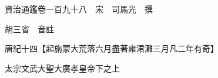 










 


 
 


 

  
  
  
  
  





  
  
  
  
  
 
  

  

  
  
  



  

 
 

  
   




  

  
  


  　　資治通鑑卷一百九十八　宋　司馬光　撰

　　胡三省　音註

　　唐紀十四【起旃蒙大荒落六月盡著雍涒灘三月凡二年有奇】

　　太宗文武大聖大廣孝皇帝下之上

